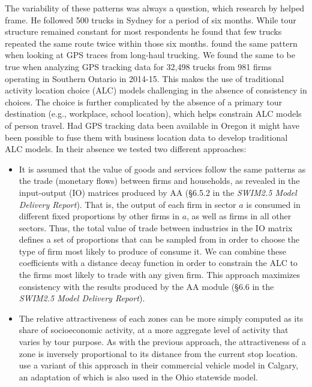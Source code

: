 The variability of these patterns was always a question, which research by \cite{figliozzi07a} helped frame. He followed 500 trucks in Sydney for a period of six months. While tour structure remained constant for most respondents he found that few trucks repeated the same route twice within those six months. \cite{sharman11} found the same pattern when looking at GPS traces from long-haul trucking. We found the same to be true when analyzing GPS tracking data for 32,498 trucks from 981 firms operating in Southern Ontario in 2014-15. This makes the use of traditional activity location choice (ALC) models challenging in the absence of consistency in choices. The choice is further complicated by the absence of a primary tour destination (e.g., workplace, school location), which helps constrain ALC models of person travel. Had GPS tracking data been available in Oregon it might have been possible to fuse them with business location data to develop traditional ALC models. In their absence we tested two different approaches:
\begin{itemize}
\item It is assumed that the value of goods and services follow the same patterns as the trade (monetary flows) between firms and households, as revealed in the input-output (IO) matrices produced by AA (\S6.5.2 in the \textit{SWIM2.5 Model Delivery Report}). That is, the output of each firm in sector $a$ is consumed in different fixed proportions by other firms in $a$, as well as firms in all other sectors. Thus, the total value of trade between industries in the IO matrix defines a set of proportions that can be sampled from in order to choose the type of firm most likely to produce of consume it. We can combine these coefficients with a distance decay function in order to constrain the ALC to the firms most likely to trade with any given firm. This approach maximizes consistency with the results produced by the AA module (\S6.6 in the \textit{SWIM2.5 Model Delivery Report}).
\item The relative attractiveness of each zones can be more simply computed as its share of socioeconomic activity, at a more aggregate level of activity that varies by tour purpose. As with the previous approach, the attractiveness of a zone is inversely proportional to its distance from the current stop location. \cite{hunt07} use a variant of this approach in their commercial vehicle model in Calgary, an adaptation of which is also used in the Ohio statewide model. 
\end{itemize}

